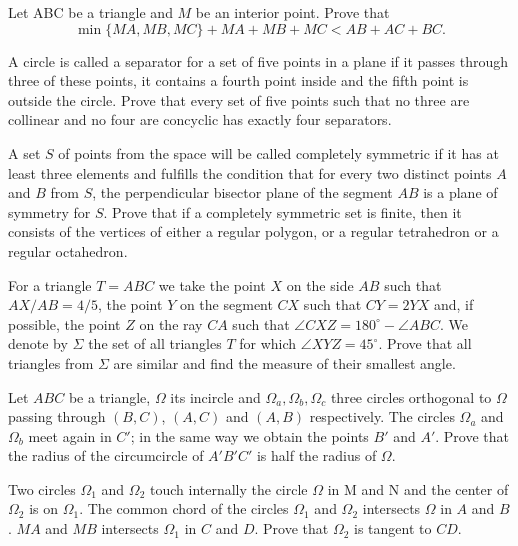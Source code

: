 \item[\textbf{G1.}]Let ABC be a triangle and $M$ be an interior point. Prove that\[ \min\{MA,MB,MC\}+MA+MB+MC<AB+AC+BC.\]

\item[\textbf{G2.}]A circle is called a separator for a set of five points in a plane if it passes through three of these points, it contains a fourth point inside and the fifth point is outside the circle. Prove that every set of five points such that no three are collinear and no four are concyclic has exactly four separators.

\item[\textbf{G3.}]A set $ S$ of points from the space will be called completely symmetric if it has at least three elements and fulfills the condition that for every two distinct points $ A$ and $ B$ from $ S$,  the perpendicular bisector plane of the segment $ AB$ is a plane of symmetry for $ S$. Prove that if a completely symmetric set is finite, then it consists of the vertices of either a regular polygon, or a regular tetrahedron or a regular octahedron.

\item[\textbf{G4.}]For a triangle $T = ABC$ we take the point $X$ on the side $AB$ such that $AX/AB=4/5$,  the point $Y$ on the segment $CX$ such that $CY = 2YX$ and, if possible, the point $Z$ on the ray $CA$ such that $\angle{CXZ} = 180^\circ - \angle{ABC}$. We denote by $\Sigma$ the set of all triangles $T$ for which $\angle{XYZ} = 45^\circ$. Prove that all triangles from $\Sigma$ are similar and find the measure of their smallest angle.

\item[\textbf{G5.}]Let $ABC$ be a triangle, $\Omega$ its incircle and $\Omega_{a}, \Omega_{b}, \Omega_{c}$ three circles orthogonal to $\Omega$ passing through $(B,C)$, $(A,C)$ and $(A,B)$ respectively. The circles $\Omega_{a}$ and $\Omega_{b}$ meet again in $C'$; in the same way we obtain the points $B'$ and $A'$. Prove that the radius of the circumcircle  of $A'B'C'$ is half the radius of $\Omega$.

\item[\textbf{G6.}]Two circles $\Omega_{1}$ and $\Omega_{2}$ touch internally the circle $\Omega$ in M and N and the center of $\Omega_{2}$ is on $\Omega_{1}$. The common chord of the circles $\Omega_{1}$ and $\Omega_{2}$ intersects $\Omega$ in $A$ and $B$. $MA$ and $MB$ intersects $\Omega_{1}$ in $C$ and $D$. Prove that $\Omega_{2}$ is tangent to $CD$.

